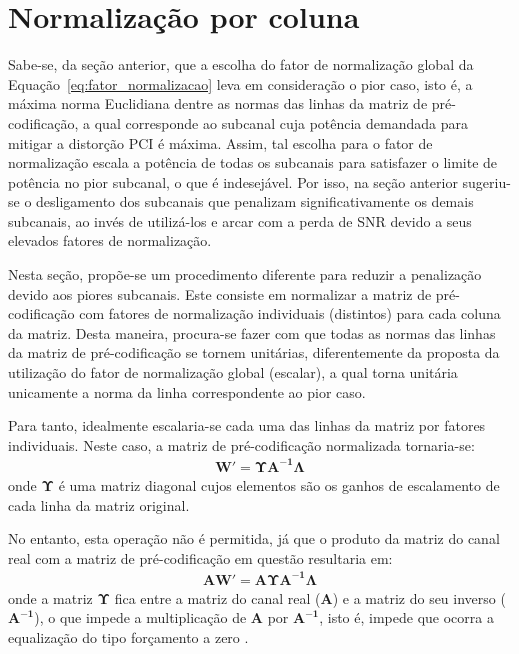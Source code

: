 
\section{Normalização por coluna}
\label{sec:normalizacao_per_tone}

Sabe-se, da seção anterior, que a escolha do fator de normalização global da Equação~\ref{eq:fator_normalizacao} leva em consideração o pior caso, isto é, a máxima norma Euclidiana dentre as normas das linhas da matriz de pré-codificação, a qual corresponde ao subcanal cuja potência demandada para mitigar a distorção PCI é máxima. Assim, tal escolha para o fator de normalização escala a potência de todas os subcanais para satisfazer o limite de potência no pior subcanal, o que é indesejável. Por isso, na seção anterior sugeriu-se o desligamento dos subcanais que penalizam significativamente os demais subcanais, ao invés de utilizá-los e arcar com a perda de SNR devido a seus elevados fatores de normalização.

Nesta seção, propõe-se um procedimento diferente para reduzir a penalização devido aos piores subcanais. Este consiste em normalizar a matriz de pré-codificação com fatores de normalização individuais (distintos) para cada coluna da matriz. Desta maneira, procura-se fazer com que todas as normas das linhas da matriz de pré-codificação se tornem unitárias, diferentemente da proposta da utilização do fator de normalização global (escalar), a qual torna unitária unicamente a norma da linha correspondente ao pior caso.

Para tanto, idealmente escalaria-se cada uma das linhas da matriz por fatores individuais. Neste caso, a matriz de pré-codificação normalizada tornaria-se:
\begin{align}
\mathbf{W}' = \mathbf{\Upsilon} \mathbf{A^{-1} \Lambda} \nonumber
\end{align}
onde $\mathbf{\Upsilon} $ é uma matriz diagonal cujos elementos são os ganhos de escalamento de cada linha da matriz original.

No entanto, esta operação não é permitida, já que o produto da matriz do canal real com a matriz de pré-codificação em questão resultaria em:
\begin{align}
\mathbf{AW'} = \mathbf{A} \mathbf{\Upsilon} \mathbf{A^{-1} \Lambda}\nonumber
\end{align}
onde a matriz $ \mathbf{\Upsilon}$ fica entre a matriz do canal real ($\mathbf{A}$) e a matriz do seu inverso ($\mathbf{A^{-1}}$), o que impede a multiplicação de $\mathbf{A}$ por $\mathbf{A^{-1}}$, isto é, impede que ocorra a equalização do tipo forçamento a zero \cite{proakis_dcomm}.

